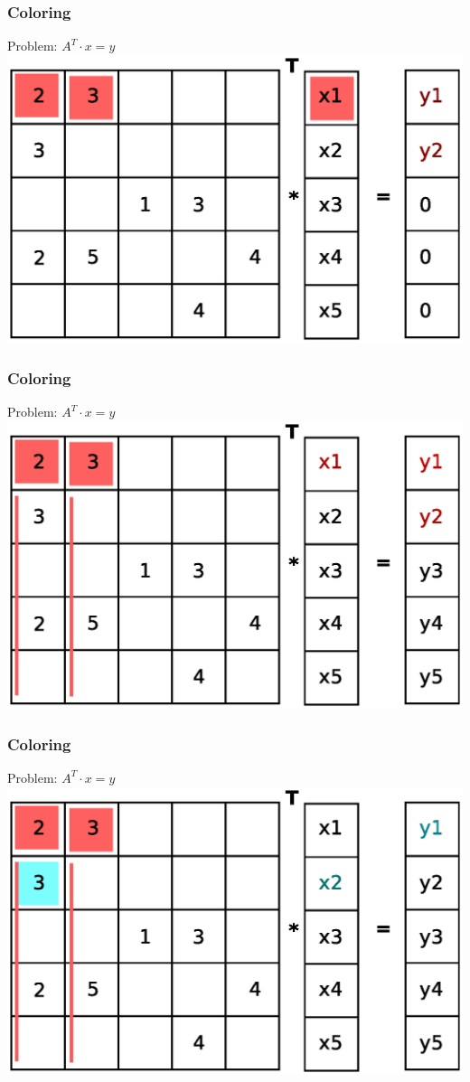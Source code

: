 \documentclass{beamer}
\begin{document}
\begin{frame}
\frametitle{Coloring}
Problem: $A^T \cdot x= y$
\includegraphics[width=0.8\linewidth]{graphic/coloringT4.eps}
\end{frame}

\begin{frame}
\frametitle{Coloring}
Problem: $A^T \cdot x= y$
\includegraphics[width=0.8\linewidth]{graphic/coloringT5.eps}
\end{frame}

\begin{frame}
\frametitle{Coloring}
Problem: $A^T \cdot x= y$
\includegraphics[width=0.8\linewidth]{graphic/coloringT6.eps}
\end{frame}
\end{document}
